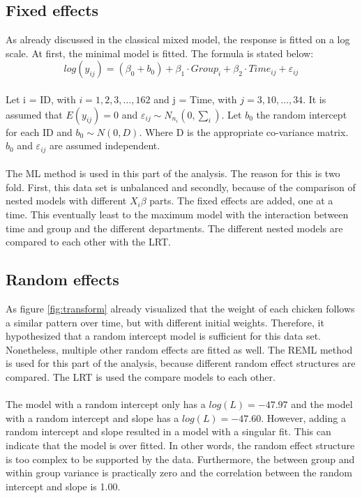 \documentclass{article}
\begin{document}
\subsection{Fixed effects}
As already discussed in the classical mixed model, the response is fitted on a log scale. At first, the minimal model is fitted. The formula is stated below:
\begin{equation}
    log(y_{ij}) =  (\beta_0 + b_0) + \beta_1 \cdot Group_i + \beta_2 \cdot Time_{ij} + \varepsilon_{ij}
\end{equation}

\paragraph{}
Let i = ID, with $i = 1,2,3,\ldots , 162$ and j = Time, with $j = 3,10,\ldots,34$. It is assumed that $E(y_{ij}) = 0$ and $\varepsilon_{ij} \sim N_{n_i}(0, \sum_i)$. Let $b_0$ the random intercept for each ID and $b_0 \sim N(0, D)$. Where D is the appropriate co-variance matrix. $b_0$ and $\varepsilon_{ij}$ are assumed independent.

\paragraph{}
The ML method is used in this part of the analysis. The reason for this is two fold. First, this data set is unbalanced and secondly, because of the comparison of nested models with different $X_i\beta$ parts. The fixed effects are added, one at a time. This eventually least to the maximum model with the interaction between time and group and the different departments. The different nested models are compared to each other with the LRT.

\subsection{Random effects}
As figure \ref{fig:transform} already visualized that the weight of each chicken follows a similar pattern over time, but with different initial weights. Therefore, it hypothesized that a random intercept model is sufficient for this data set. Nonetheless, multiple other random effects are fitted as well. The REML method is used for this part of the analysis, because different random effect structures are compared. The LRT is used the compare models to each other.

\paragraph{}
The model with a random intercept only has a $log(L) = -47.97$ and the model with a random intercept and slope has a $log(L) = -47.60$. However, adding a random intercept and slope resulted in a model with a singular fit. This can indicate that the model is over fitted. In other words, the random effect structure is too complex to be supported by the data. Furthermore, the between group and within group variance is practically zero and the correlation between the random intercept and slope is 1.00.
\end{document}
